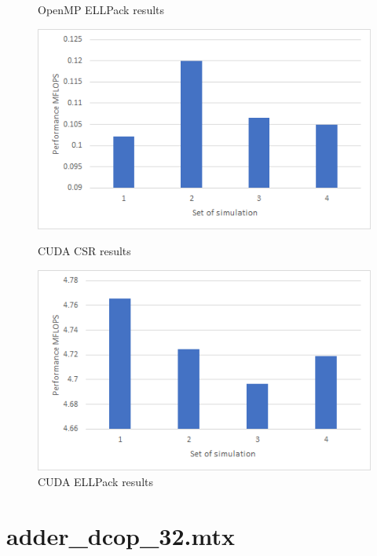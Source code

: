 \documentclass{scrreprt}
\begin{document}
\begin{figure}[ht]
\begin{minipage}[b]{0.5\linewidth}
    \caption{OpenMP ELLPack results} 
    \vspace{4ex}
  \end{minipage} 
  \begin{minipage}[b]{0.5\linewidth}
    \centering
    \includegraphics[width=.9\linewidth]{cage4CSRCUDA.png} 
    \caption{CUDA CSR results} 
    \vspace{4ex}
  \end{minipage}%
  \begin{minipage}[b]{0.5\linewidth}
    \centering
    \includegraphics[width=.9\linewidth]{cage4ELLCUDA.png} 
    \caption{CUDA ELLPack  results} 
    \vspace{4ex}
  \end{minipage} 
\end{figure}
\FloatBarrier



\section{adder_dcop_32.mtx}
\end{document}
